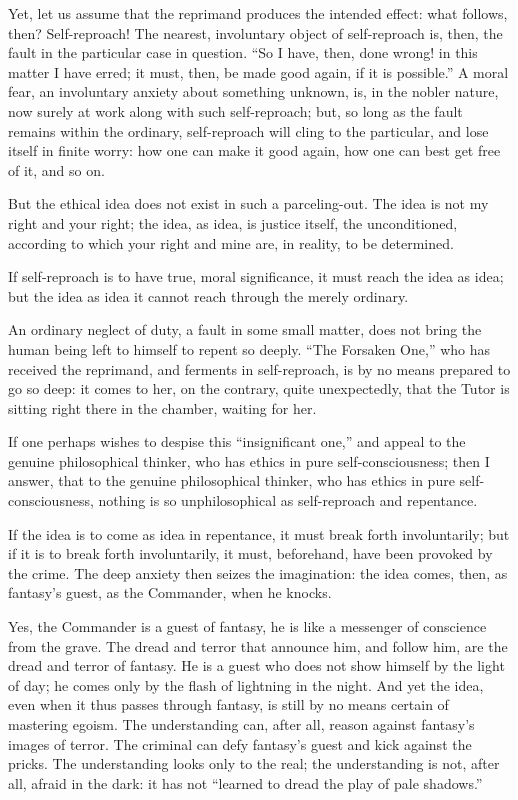 \documentclass[12pt,a4paper]{book}
\begin{document}
Yet, let us assume that the reprimand produces the intended effect: what follows, then? Self-reproach! The nearest, involuntary object of self-reproach is, then, the fault in the particular case in question. ``So I have, then, done wrong! in this matter I have erred; it must, then, be made good again, if it is possible.''
A moral fear, an involuntary anxiety about something unknown, is, in the nobler nature, now surely at work along with such self-reproach; but, so long as the fault remains within the ordinary, self-reproach will cling to the particular, and lose itself in finite worry: how one can make it good again, how one can best get free of it, and so on.

But the ethical idea does not exist in such a parceling-out. The idea is not my right and your right; the idea, as idea, is justice itself, the unconditioned, according to which your right and mine are, in reality, to be determined.

If self-reproach is to have true, moral significance, it must reach the idea as idea; but the idea as idea it cannot reach through the merely ordinary.

An ordinary neglect of duty, a fault in some small matter, does not bring the human being left to himself to repent so deeply. ``The Forsaken One,'' who has received the reprimand, and ferments in self-reproach, is by no means prepared to go so deep: it comes to her, on the contrary, quite unexpectedly, that the Tutor is sitting right there in the chamber, waiting for her.

If one perhaps wishes to despise this ``insignificant one,'' and appeal to the genuine philosophical thinker, who has ethics in pure self-consciousness; then I answer, that to the genuine philosophical thinker, who has ethics in pure self-consciousness, nothing is so unphilosophical as self-reproach and repentance.

If the idea is to come as idea in repentance, it must break forth involuntarily; but if it is to break forth involuntarily, it must, beforehand, have been provoked by the crime. The deep anxiety then seizes the imagination: the idea comes, then, as fantasy's guest, as the Commander, when he knocks.

Yes, the Commander is a guest of fantasy, he is like a messenger of conscience from the grave. The dread and terror that announce him, and follow him, are the dread and terror of fantasy. He is a guest who does not show himself by the light of day; he comes only by the flash of lightning in the night.
And yet the idea, even when it thus passes through fantasy, is still by no means certain of mastering egoism. The understanding can, after all, reason against fantasy's images of terror. The criminal can defy fantasy's guest and kick against the pricks. The understanding looks only to the real; the understanding is not, after all, afraid in the dark: it has not ``learned to dread the play of pale shadows.''
\end{document}
